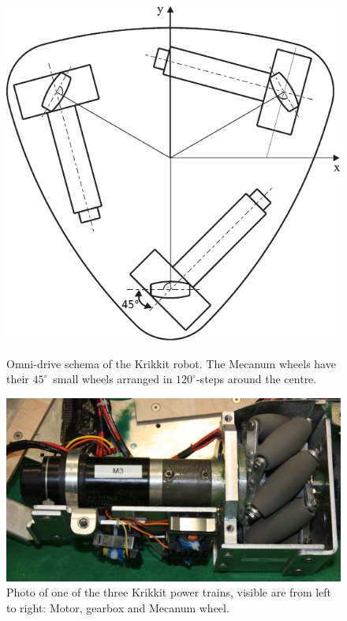 \documentclass[12pt,a4paper]{article}
\begin{document}
\begin{figure}[htbp]
  \begin{minipage}{0.45\textwidth}
   \centering
    \includegraphics[width=1\textwidth]{figures/krikkit_drive_angles}
    \caption{\label{fig:omnidrive}Omni-drive schema of the Krikkit robot. The Mecanum wheels have their $45^\circ$~small wheels arranged in $120^\circ${-}steps around the centre.
    \cite{mecanum2007}}
  \end{minipage}\hfill
  \begin{minipage}{0.45\textwidth}
   \centering
    \includegraphics[width=1\textwidth]{figures/Omniwheel_drive.png}
    \caption{\label{fig:mec-wheel}Photo of one of the three Krikkit power trains, visible are from left to right: Motor, gearbox and Mecanum wheel.}
  \end{minipage}
\end{figure}
\end{document}
